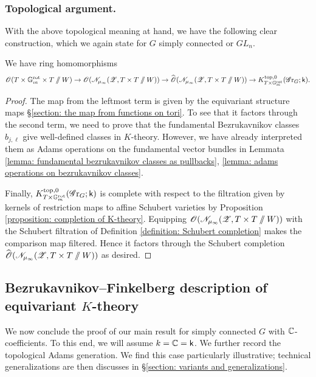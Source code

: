 \subsubsection{Topological argument.}
With the above topological meaning at hand, we have the following clear construction, which we again state for $G$ simply connected or $GL_n$.
\begin{lemma}
    We have ring homomorphisms
    \begin{equation*}
        \operatorname{\mathscr{O}}(T \times \mathbb{G}_m^{\mathrm{rot}} \times T \sslash W) \to \operatorname{\mathscr{O}}(\mathscr{N}_{\mu_{\infty}}(\operatorname{\mathscr{Z}}, T \times T \sslash W)) \to \widehat{\operatorname{\mathscr{O}}}(\mathscr{N}_{\mu_{\infty}}(\operatorname{\mathscr{Z}}, T \times T \sslash W)) \to K^{\mathrm{top}, 0}_{T \times \mathbb{G}_m^{\mathrm{rot}}}(\operatorname{\mathscr{G}r}_G; \mathsf{k}).
    \end{equation*}
\end{lemma}
\begin{proof}
The map from the leftmost term is given by the equivariant structure maps \S \ref{section: the map from functions on tori}. To see that it factors through the second term, we need to prove that the fundamental Bezrukavnikov classes $b_{j, \ell}$ give well-defined classes in $K$-theory. However, we have already interpreted them as Adams operations on the fundamental vector bundles in Lemmata \ref{lemma: fundamental bezrukavnikov classes as pullbacks}, \ref{lemma: adams operations on bezrukavnikov classes}.

Finally, $K^{\mathrm{top}, 0}_{T \times \mathbb{G}_m^{\mathrm{rot}}}(\operatorname{\mathscr{G}r}_G; \mathsf{k})$ is complete with respect to the filtration given by kernels of restriction maps to affine Schubert varieties by Proposition \ref{proposition: completion of K-theory}. Equipping $\operatorname{\mathscr{O}}(\mathscr{N}_{\mu_{\infty}}(\operatorname{\mathscr{Z}}, T \times T \sslash W))$ with the Schubert filtration of Definition \ref{definition: Schubert completion} makes the comparison map filtered. Hence it factors through the Schubert completion $\widehat{\operatorname{\mathscr{O}}}(\mathscr{N}_{\mu_{\infty}}(\operatorname{\mathscr{Z}}, T \times T \sslash W))$ as desired.
\end{proof}





\subsection{Bezrukavnikov--Finkelberg description of equivariant \texorpdfstring{$K$}{K}-theory}\label{section: bezrukavnikov--finkelberg description of equivariant K-theory}
We now conclude the proof of our main result for simply connected $G$ with $\operatorname{\mathbb{C}}$-coefficients. To this end, we will assume $k = \operatorname{\mathbb{C}} = \mathsf{k}$. We further record the topological Adams generation. We find this case particularly illustrative; technical generalizations are then discusses in \S \ref{section: variants and generalizations}. 

